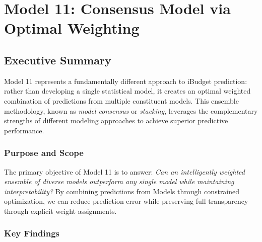 \chapter{Model 11: Consensus Model via Optimal Weighting}\label{ch:model11}




\def\themodel{11}

\section{Executive Summary}

Model 11 represents a fundamentally different approach to iBudget prediction: rather than developing a single statistical model, it creates an optimal weighted combination of predictions from multiple constituent models. This ensemble methodology, known as \textit{model consensus} or \textit{stacking}, leverages the complementary strengths of different modeling approaches to achieve superior predictive performance.

\subsection{Purpose and Scope}

The primary objective of Model 11 is to answer: \textit{Can an intelligently weighted ensemble of diverse models outperform any single model while maintaining interpretability?} By combining predictions from Models \ModelElevenModelsIncluded{} through constrained optimization, we can reduce prediction error while preserving full transparency through explicit weight assignments.

\subsection{Key Findings}

